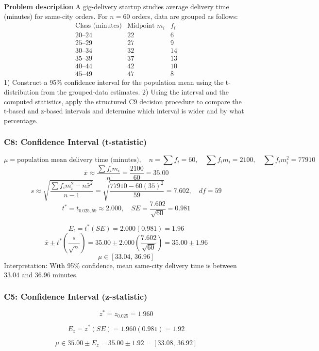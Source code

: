 \begin{ExamProblems}
		\newpage
		\item
		\textbf{Problem description}
		A gig-delivery startup studies average delivery time (minutes) for same-city orders.
		For $n=60$ orders, data are grouped as follows:
		\[
		\begin{array}{c|c|c}
		\text{Class (minutes)} & \text{Midpoint }m_i & f_i\\\hline
		20\text{--}24 & 22 & 6\\
		25\text{--}29 & 27 & 9\\
		30\text{--}34 & 32 & 14\\
		35\text{--}39 & 37 & 13\\
		40\text{--}44 & 42 & 10\\
		45\text{--}49 & 47 & 8
		\end{array}
		\]
		1) Construct a 95\% confidence interval for the population mean using the t-distribution from the grouped-data estimates.
		2) Using the interval and the computed statistics, apply the structured C9 decision procedure to compare the t-based and z-based intervals and determine which interval is wider and by what percentage.

		\subsubsection*{C8: Confidence Interval (t-statistic)}
		\[
		\mu=\text{population mean delivery time (minutes)},\quad n=\sum f_i=60,\quad \sum f_im_i=2100,\quad \sum f_im_i^2=77910
		\]
		\[
		\bar{x}\approx\frac{\sum f_im_i}{n}=\frac{2100}{60}=35.00
		\]
		\[
		s\approx\sqrt{\frac{\sum f_im_i^2-n\bar{x}^2}{n-1}}=\sqrt{\frac{77910-60(35)^2}{59}}=7.602,\quad df=59
		\]
		\[
		t^*=t_{0.025,59}\approx 2.000,\quad SE=\frac{7.602}{\sqrt{60}}=0.981
		\]

		\[
		E_t=t^*(SE)=2.000(0.981)=1.96
		\]
		\[
		\bar{x}\pm t^*\left(\frac{s}{\sqrt{n}}\right)=35.00\pm 2.000\left(\frac{7.602}{\sqrt{60}}\right)=35.00\pm 1.96
		\]
		\[
		\mu\in[33.04,\,36.96]
		\]
		Interpretation: With 95\% confidence, mean same-city delivery time is between 33.04 and 36.96 minutes.

		\subsubsection*{C5: Confidence Interval (z-statistic)}
		\[
		z^*=z_{0.025}=1.960
		\]

		\[
		E_z=z^*(SE)=1.960(0.981)=1.92
		\]

		\[
		\mu\in 35.00\pm E_z=35.00\pm 1.92=[33.08,\,36.92]
		\]


\end{ExamProblems}
